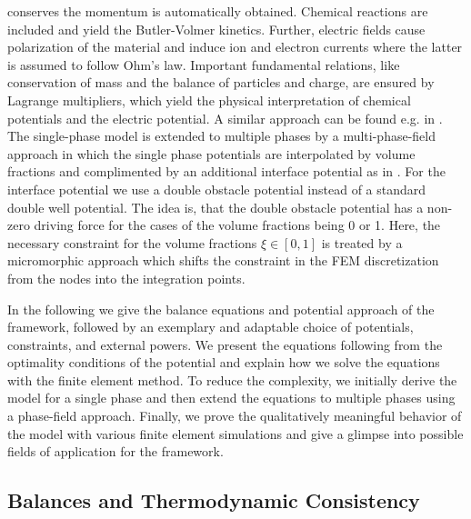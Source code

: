 conserves the momentum is automatically obtained. Chemical reactions are included and yield the Butler-Volmer kinetics\supercite{bazant_theory_2013}. Further, electric fields cause polarization of the material and induce ion and electron currents where the latter is assumed to follow Ohm's law. Important fundamental relations, like conservation of mass and the balance of particles and charge, are ensured by Lagrange multipliers, which yield the physical interpretation of chemical potentials and the electric potential. A similar approach can be found e.g. in . The single-phase model is extended to multiple phases by a multi-phase-field approach in which the single phase potentials are interpolated by volume fractions and complimented by an additional interface potential as in . For the interface potential we use a double obstacle potential \supercite{steinbach_multi_2006} instead of a standard double well potential. The idea is, that the double obstacle potential has a non-zero driving force for the cases of the volume fractions being 0 or 1. Here, the necessary constraint for the volume fractions $\xi\in[0,1]$ is treated by a micromorphic approach \supercite{forest_micromorphic_2009} which shifts the constraint in the FEM discretization from the nodes into the integration points. 

In the following we give the balance equations and potential approach of the framework, followed by an exemplary and adaptable choice of potentials, constraints, and external powers. We present the equations following from the optimality conditions of the potential and explain how we solve the equations with the finite element method. To reduce the complexity, we initially derive the model for a single phase and then extend the equations to multiple phases using a phase-field approach. Finally, we prove the qualitatively meaningful behavior of the model with various finite element simulations and give a glimpse into possible fields of application for the framework.


\subsection{Balances and Thermodynamic Consistency} \label{sec:balances}%

